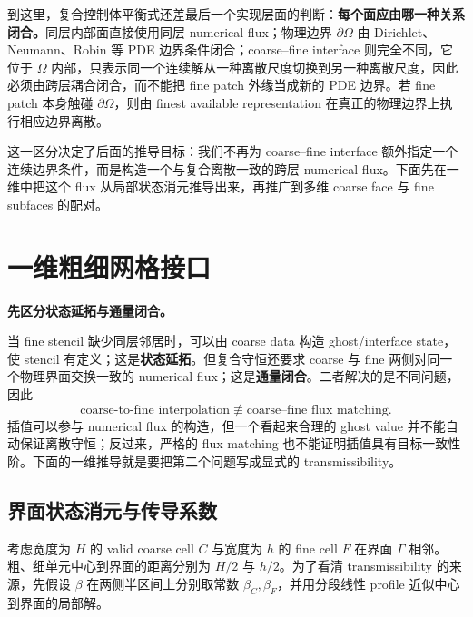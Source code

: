 到这里，复合控制体平衡式还差最后一个实现层面的判断：\textbf{每个面应由哪一种关系闭合。}同层内部面直接使用同层 numerical flux；物理边界 $\partial\Omega$ 由 Dirichlet、Neumann、Robin 等 PDE 边界条件闭合；coarse--fine interface 则完全不同，它位于 $\Omega$ 内部，只表示同一个连续解从一种离散尺度切换到另一种离散尺度，因此必须由跨层耦合闭合，而不能把 fine patch 外缘当成新的 PDE 边界。若 fine patch 本身触碰 $\partial\Omega$，则由 finest available representation 在真正的物理边界上执行相应边界离散。

这一区分决定了后面的推导目标：我们不再为 coarse--fine interface 额外指定一个连续边界条件，而是构造一个与复合离散一致的跨层 numerical flux。下面先在一维中把这个 flux 从局部状态消元推导出来，再推广到多维 coarse face 与 fine subfaces 的配对。

\section{一维粗细网格接口}
\label{sec:amr-1d-interface}

\begin{keybox}
\textbf{先区分状态延拓与通量闭合。}

当 fine stencil 缺少同层邻居时，可以由 coarse data 构造 ghost/interface state，使 stencil 有定义；这是\textbf{状态延拓}。但复合守恒还要求 coarse 与 fine 两侧对同一个物理界面交换一致的 numerical flux；这是\textbf{通量闭合}。二者解决的是不同问题，因此
\[
\boxed{
\text{coarse-to-fine interpolation}
\not\equiv
\text{coarse--fine flux matching}.
}
\]
插值可以参与 numerical flux 的构造，但一个看起来合理的 ghost value 并不能自动保证离散守恒；反过来，严格的 flux matching 也不能证明插值具有目标一致性阶。下面的一维推导就是要把第二个问题写成显式的 transmissibility。
\end{keybox}

\subsection{界面状态消元与传导系数}

考虑宽度为 $H$ 的 valid coarse cell $C$ 与宽度为 $h$ 的 fine cell $F$ 在界面 $\Gamma$ 相邻。粗、细单元中心到界面的距离分别为 $H/2$ 与 $h/2$。为了看清 transmissibility 的来源，先假设 $\beta$ 在两侧半区间上分别取常数 $\beta_C,\beta_F$，并用分段线性 profile 近似中心到界面的局部解。

